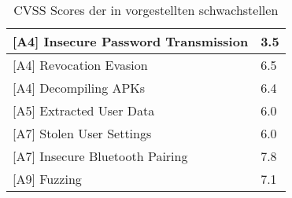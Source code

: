 \begin{table}[H]
\begin{tabular}{|l|l|}
\rowcolor{light-gray}
{[}A4{]} Insecure Password Transmission     & \cellcolor{yellow}3.5            \\ \hline
{[}A4{]} Revocation Evasion                 & \cellcolor{orange}6.5            \\ \hline
\rowcolor{light-gray}
{[}A4{]} Decompiling APKs                   & \cellcolor{orange}6.4            \\ \hline
{[}A5{]} Extracted User Data                & \cellcolor{orange}6.0            \\ \hline
\rowcolor{light-gray}
{[}A7{]} Stolen User Settings               & \cellcolor{orange}6.0            \\ \hline
{[}A7{]} Insecure Bluetooth Pairing         & \cellcolor{redorange}7.8            \\ \hline
\rowcolor{light-gray}
{[}A9{]} Fuzzing                            & \cellcolor{redorange}7.1            \\ \hline
        \end{tabular}
        \caption[CVSS Scores des Prototypen]{CVSS Scores der in  vorgestellten schwachstellen}
        \label{tab:vulns_cvss_short}
    \end{table}
